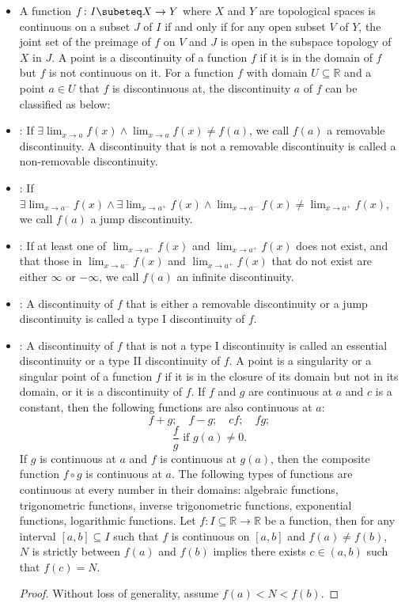 \documentclass[a4paper,12pt]{report}
\begin{document}
\begin{itemize}
\begin{itemize}
\item A function $f\colon I\subeteq X\to Y$ where $X$ and $Y$ are topological spaces is continuous on a subset $J$ of $I$ if and only if for any open subset $V$ of $Y$, the joint set of the preimage of $f$ on $V$ and $J$ is open in the subspace topology of $X$ in $J$.
\eit
{}
A point is a discontinuity of a function $f$ if it is in the domain of $f$ but $f$ is not continuous on it.
For a function $f$ with domain $U\subseteq\mathbb{R}$ and a point $a\in U$ that $f$ is discontinuous at, the discontinuity $a$ of $f$ can be classified as below:
\bit
\item {}: If $\exists\lim_{x\to a}f(x)\land\lim_{x\to a}f(x)\neq f(a)$, we call $f(a)$ a removable discontinuity. A discontinuity that is not a removable discontinuity is called a non-removable discontinuity.
\item {}: If $\exists\lim_{x\to a^-}f(x)\land\exists\lim_{x\to a^+}f(x)\land\lim_{x\to a^-}f(x)\neq\lim_{x\to a^+}f(x)$, we call $f(a)$ a jump discontinuity.
\item{}: If at least one of $\lim_{x\to a^-}f(x)$ and $\lim_{x\to a^+}f(x)$ does not exist, and that those in $\lim_{x\to a^-}f(x)$ and $\lim_{x\to a^+}f(x)$ that do not exist are either $\infty$ or $-\infty$, we call $f(a)$ an infinite discontinuity.
\item{}: A discontinuity of $f$ that is either a removable discontinuity or a jump discontinuity is called a type I discontinuity of $f$.
\item{}: A discontinuity of $f$ that is not a type I discontinuity is called an essential discontinuity or a type II discontinuity of $f$.
\eit
{}
A point is a singularity or a singular point of a function $f$ if it is in the closure of its domain but not in its domain, or it is a discontinuity of $f$.
If $f$ and $g$ are continuous at $a$ and $c$ is a constant, then the following functions are also continuous at $a$:
\[f+g;\quad f-g;\quad cf;\quad fg;\]
\[\frac{f}{g}\text{\ if\ }g(a)\neq 0.\]
If $g$ is continuous at $a$ and $f$ is continuous at $g(a)$, then the composite function $f\circ g$ is continuous at $a$.
The following types of functions are continuous at every number in their domains: algebraic functions, trigonometric functions, inverse trigonometric functions, exponential functions, logarithmic functions.
Let $f\colon I\subseteq\mathbb{R}\to\mathbb{R}$ be a function, then for any interval $[a,b]\subseteq I$ such that $f$ is continuous on $[a,b]$ and $f(a)\neq f(b)$, $N$ is strictly between $f(a)$ and $f(b)$ implies there exists $c\in (a,b)$ such that $f(c)=N$.
\begin{proof}
Without loss of generality, assume $f(a)<N<f(b)$.


\end{proof}
\end{itemize}
\end{itemize}
\end{document}
